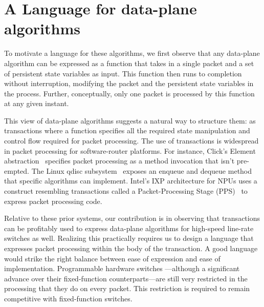 \section{A Language for data-plane algorithms}
\label{s:language}

To motivate a language for these algorithms, we first observe that any
data-plane algorithm can be expressed as a function that takes in a single
packet and a set of persistent state variables as input. This function then
runs to completion without interruption, modifying the packet and the
persistent state variables in the process. Further, conceptually, only one
packet is processed by this function at any given instant.

This view of data-plane algorithms suggests a natural way to structure them: as
transactions where a function specifies all the required state manipulation and
control flow required for packet processing. The use of transactions is
widespread in packet processing for software-router platforms. For instance,
Click's Element abstraction~\cite{kohler_thesis} specifies packet processing as
a method invocation that isn't pre-empted.  The Linux qdisc
subsystem~\cite{qdisc} exposes an enqueue and dequeue method that specific
algorithms can implement. Intel's IXP architecture for NPUs uses a construct
resembling transactions called a Packet-Processing Stage
(PPS)~\cite{intel_pldi} to express packet processing code.

Relative to these prior systems, our contribution is in observing that
transactions can be profitably used to express data-plane algorithms for
high-speed line-rate switches as well. Realizing this practically requires us
to design a language that expresses packet processing within the body of the
transaction. A good language would strike the right balance between ease of
expression and ease of implementation. Programmable hardware switches
---although a significant advance over their fixed-function counterparts---are
still very restricted in the processing that they do on every packet. This
restriction is required to remain competitive with fixed-function switches.

